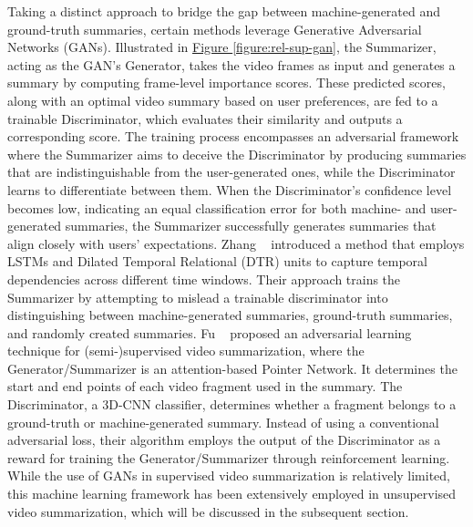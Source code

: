 Taking a distinct approach to bridge the gap between machine-generated and ground-truth summaries, certain methods leverage Generative Adversarial Networks (GANs). Illustrated in \hyperref[figure:rel-sup-gan]{Figure \ref{figure:rel-sup-gan}}, the Summarizer, acting as the GAN's Generator, takes the video frames as input and generates a summary by computing frame-level importance scores. These predicted scores, along with an optimal video summary based on user preferences, are fed to a trainable Discriminator, which evaluates their similarity and outputs a corresponding score. The training process encompasses an adversarial framework where the Summarizer aims to deceive the Discriminator by producing summaries that are indistinguishable from the user-generated ones, while the Discriminator learns to differentiate between them. When the Discriminator's confidence level becomes low, indicating an equal classification error for both machine- and user-generated summaries, the Summarizer successfully generates summaries that align closely with users' expectations. Zhang \etal~\cite{zhang2019dtr} introduced a method that employs LSTMs and Dilated Temporal Relational (DTR) units to capture temporal dependencies across different time windows. Their approach trains the Summarizer by attempting to mislead a trainable discriminator into distinguishing between machine-generated summaries, ground-truth summaries, and randomly created summaries. Fu \etal~\cite{fu2019attentive} proposed an adversarial learning technique for (semi-)supervised video summarization, where the Generator/Summarizer is an attention-based Pointer Network. It determines the start and end points of each video fragment used in the summary. The Discriminator, a 3D-CNN classifier, determines whether a fragment belongs to a ground-truth or machine-generated summary. Instead of using a conventional adversarial loss, their algorithm employs the output of the Discriminator as a reward for training the Generator/Summarizer through reinforcement learning. While the use of GANs in supervised video summarization is relatively limited, this machine learning framework has been extensively employed in unsupervised video summarization, which will be discussed in the subsequent section.